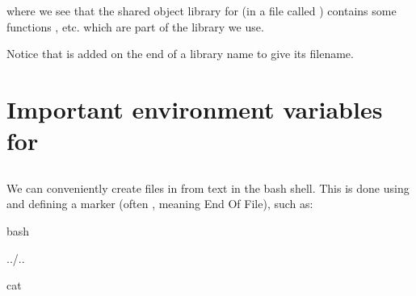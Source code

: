 \documentclass[letterpaper,10pt,english]{sphinxmanual}
\begin{document}
where we see that the shared object library for  (in a file called ) contains some functions ,  etc. which are part of the library we use.

Notice that  is added on the end of a library name to give its filename.


\section{Important environment variables for }
\label{\detokenize{Appendix1:Important-environment-variables-for-librat}}

\subsection{}
\label{\detokenize{Appendix1:cat-<<EOF->-output-...-EOF}}
We can conveniently create files in  from text in the bash shell. This is done using  and defining a marker (often , meaning End Of File), such as:

{
\begin{sphinxVerbatim}[commandchars=\\\{\}]
\llap{\color{nbsphinxin}[20]:\,\hspace{\fboxrule}\hspace{\fboxsep}}\PYGZpc{}\PYGZpc{}bash

 ../..

cat 
\end{sphinxVerbatim}
}
\end{document}
